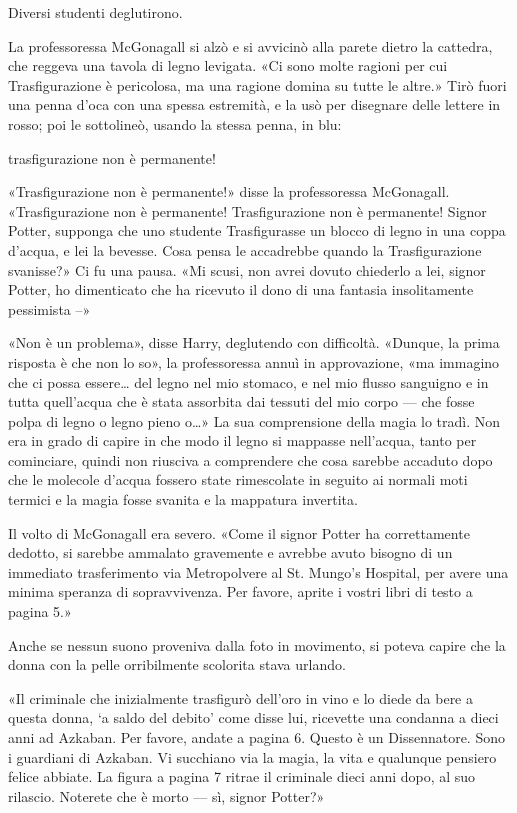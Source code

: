 Diversi studenti deglutirono.

La professoressa McGonagall si alzò e si avvicinò alla parete dietro la cattedra, che reggeva una tavola di legno levigata. «Ci sono molte ragioni per cui Trasfigurazione è pericolosa, ma una ragione domina su tutte le altre.» Tirò fuori una penna d’oca con una spessa estremità, e la usò per disegnare delle lettere in rosso; poi le sottolineò, usando la stessa penna, in blu:

trasfigurazione non è permanente!

«Trasfigurazione non è permanente!» disse la professoressa McGonagall. «Trasfigurazione non è permanente! Trasfigurazione non è permanente! Signor Potter, supponga che uno studente Trasfigurasse un blocco di legno in una coppa d’acqua, e lei la bevesse. Cosa pensa le accadrebbe quando la Trasfigurazione svanisse?» Ci fu una pausa. «Mi scusi, non avrei dovuto chiederlo a lei, signor Potter, ho dimenticato che ha ricevuto il dono di una fantasia insolitamente pessimista –»

«Non è un problema», disse Harry, deglutendo con difficoltà. «Dunque, la prima risposta è che non lo so», la professoressa annuì in approvazione, «ma immagino che ci possa essere… del legno nel mio stomaco, e nel mio flusso sanguigno e in tutta quell’acqua che è stata assorbita dai tessuti del mio corpo — che fosse polpa di legno o legno pieno o…» La sua comprensione della magia lo tradì. Non era in grado di capire in che modo il legno si mappasse nell’acqua, tanto per cominciare, quindi non riusciva a comprendere che cosa sarebbe accaduto dopo che le molecole d’acqua fossero state rimescolate in seguito ai normali moti termici e la magia fosse svanita e la mappatura invertita.

Il volto di McGonagall era severo. «Come il signor Potter ha correttamente dedotto, si sarebbe ammalato gravemente e avrebbe avuto bisogno di un immediato trasferimento via Metropolvere al St. Mungo’s Hospital, per avere una minima speranza di sopravvivenza. Per favore, aprite i vostri libri di testo a pagina 5.»

Anche se nessun suono proveniva dalla foto in movimento, si poteva capire che la donna con la pelle orribilmente scolorita stava urlando.

«Il criminale che inizialmente trasfigurò dell’oro in vino e lo diede da bere a questa donna, ‘a saldo del debito’ come disse lui, ricevette una condanna a dieci anni ad Azkaban. Per favore, andate a pagina 6. Questo è un Dissennatore. Sono i guardiani di Azkaban. Vi succhiano via la magia, la vita e qualunque pensiero felice abbiate. La figura a pagina 7 ritrae il criminale dieci anni dopo, al suo rilascio. Noterete che è morto — sì, signor Potter?»

